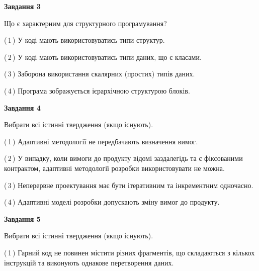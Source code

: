 \documentclass[10pt, ukrainian]{article}
\begin{document}
{\begin {large}
{\begin {center}\textbf{Завдання 3}\end {center}}\par
Що є характерним для структурного програмування?\par
\vspace{2mm}



(\,1\,) У коді мають використовуватись типи структур. %



(\,2\,) У коді мають використовуватись типи даних, що є класами. %



(\,3\,) Заборона використання скалярних (простих) типів даних. %



(\,4\,) Програма зображується ієрархічною структурою блоків.%


{\begin {center}\textbf{Завдання 4}\end {center}}\par
Вибрати всі істинні твердження (якщо існують).\par
\vspace{2mm}



(\,1\,) Адаптивні методології не передбачають визначення вимог. %



(\,2\,) У випадку, коли вимоги до продукту відомі заздалегідь та є фіксованими контрактом, адаптивні методології розробки використовувати не можна. %



(\,3\,) Неперервне проектування має бути ітеративним та інкрементним одночасно. %



(\,4\,) Адаптивні моделі розробки допускають зміну вимог до продукту. %


{\begin {center}\textbf{Завдання 5}\end {center}}\par
Вибрати всі істинні твердження (якщо існують).\par
\vspace{2mm}



(\,1\,) Гарний код не повинен містити різних фрагментів, що складаються з кількох інструкцій та виконують однакове перетворення даних. %




\end{large}}
\end{document}

